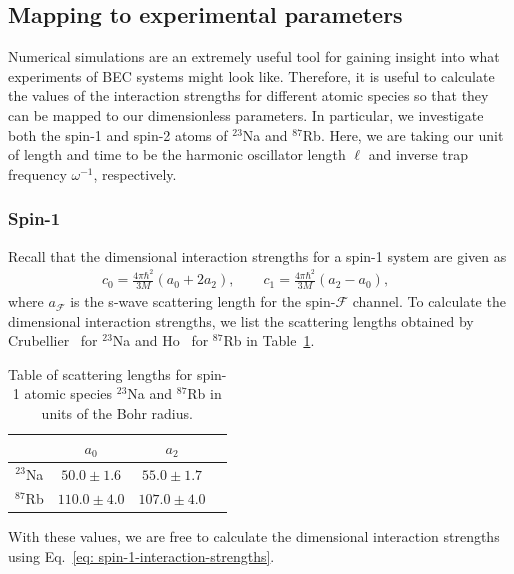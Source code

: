 \subsection{\label{subsec: experimental-params}
Mapping to experimental parameters}
Numerical simulations are an extremely useful tool for gaining insight into
what experiments of BEC systems might look like.
Therefore, it is useful to calculate the values of the interaction strengths
for different atomic species so that they can be mapped to our dimensionless
parameters.
In particular, we investigate both the spin-1 and spin-2 atoms of \( ^{23}\)Na
and \( ^{87}\)Rb.
Here, we are taking our unit of length and time to be the harmonic oscillator
length \(\ell \) and inverse trap frequency \(\omega^{-1}\), respectively.

\subsubsection{Spin-1}
Recall that the dimensional interaction strengths for a spin-1 system are given
as
\begin{align}\label{eq: spin-1-interaction-strengths}
    c_0 = \frac{4\pi\hbar^2}{3M}(a_0+2a_2), \qquad
    c_1 = \frac{4\pi\hbar^2}{3M}(a_2-a_0), \qquad
\end{align}
where \(a_\mathcal{F}\) is the s-wave scattering length for the
spin-\(\mathcal{F}\) channel.
To calculate the dimensional interaction strengths, we list the scattering
lengths obtained by Crubellier~\cite{Crubellier1999} for \( ^{23}\)Na and
Ho~\cite{Ho1998} for \( ^{87}\)Rb in
Table~\ref{table: scaterring-lengths-spin-1}.
\begin{table}[htbp]
    \centering
    \begin{tabular}{ cccc } 
     \toprule
      & \(a_0\) & \(a_2\) \\
      \midrule
      \( ^{23}\)Na & \(50.0\pm 1.6\) & \(55.0\pm 1.7\) \\ 
      \( ^{87}\)Rb & \(110.0\pm 4.0\) & \(107.0\pm 4.0\) \\
      \bottomrule
    \end{tabular}
    \caption[Scattering lengths for spin-1 atomic species \( ^{23}\)Na and
    \( ^{87}\)Rb]{\label{table: scaterring-lengths-spin-1}Table of scattering
    lengths for spin-1 atomic species \( ^{23}\)Na and \( ^{87}\)Rb in units of
    the Bohr radius.}
\end{table}
With these values, we are free to calculate the dimensional interaction
strengths using Eq.~\eqref{eq: spin-1-interaction-strengths}.

